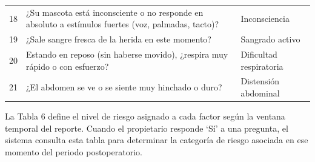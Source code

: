 \documentclass[stu, spanish]{apa7}
\begin{document}
\begin{table}[htbp]
\begin{tabular}{@{}cp{8.5cm}l@{}}
18 & ¿Su mascota est\'{a} inconsciente o no responde en absoluto a est\'{i}mulos fuertes (voz, palmadas, tacto)? & Inconsciencia \\
19 & ¿Sale sangre fresca de la herida en este momento? & Sangrado activo \\
20 & Estando en reposo (sin haberse movido), ¿respira muy r\'{a}pido o con esfuerzo? & Dificultad respiratoria \\
21 & ¿El abdomen se ve o se siente muy hinchado o duro? & Distensi\'{o}n abdominal \\
\bottomrule
\end{tabular}
\end{table}

La Tabla 6 define el nivel de riesgo asignado a cada factor seg\'{u}n la ventana temporal del reporte. Cuando el propietario responde \textquoteleft S\'{i}\textquoteright{} a una pregunta, el sistema consulta esta tabla para determinar la categor\'{i}a de riesgo asociada en ese momento del periodo postoperatorio.
\end{document}
